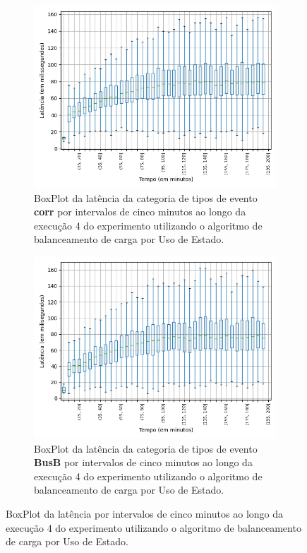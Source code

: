 \begin{figure}
\begin{subfigure}{.5\textwidth}
\centering
\includegraphics[width=\textwidth]{figuras/graphics/boxplot_9-dez-su_corr.png}
\caption{BoxPlot da latência da categoria de tipos de evento \textbf{corr} por intervalos de cinco minutos ao longo da execução 4 do experimento utilizando o algoritmo de balanceamento de carga por Uso de Estado.}
\label{fig:BoxPlot_corr_SU_9-dez-su}
\end{subfigure}%
\begin{subfigure}{.5\textwidth}
\centering
\includegraphics[width=\textwidth]{figuras/graphics/boxplot_9-dez-su_busb.png}
\caption{BoxPlot da latência da categoria de tipos de evento \textbf{BusB} por intervalos de cinco minutos ao longo da execução 4 do experimento utilizando o algoritmo de balanceamento de carga por Uso de Estado.}
\label{fig:BoxPlot_BusB_SU_9-dez-su}
\end{subfigure}%
\caption{BoxPlot da latência por intervalos de cinco minutos ao longo da execução 4 do experimento utilizando o algoritmo de balanceamento de carga por Uso de Estado.}
\end{figure}






